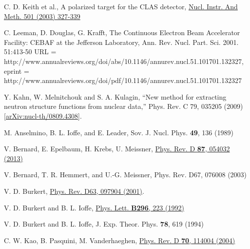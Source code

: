  C. D. Keith et al., A polarized target for the CLAS detector,                \href{https://userweb.jlab.org/\~ckeith/EG1/nim.pdf}{Nucl. Instr. And Meth. 501 (2003) 327-339}


 C. Leeman, D. Douglas, G. Krafft, The Continuous Electron Beam Accelerator Facility: CEBAF at the Jefferson Laboratory, Ann. Rev. Nucl. Part. Sci. 2001. 51:413-50     URL = {http://www.annualreviews.org/doi/abs/10.1146/annurev.nucl.51.101701.132327},   eprint = {http://www.annualreviews.org/doi/pdf/10.1146/annurev.nucl.51.101701.132327}

 Y. Kahn, W. Melnitchouk and S. A. Kulagin, “New method for extracting neutron structure functions from nuclear data,” Phys. Rev. C 79, 035205 (2009) \href{http://arxiv.org/abs/0809.4308}{[arXiv:nucl-th/0809.4308]}.

 M. Anselmino, B. L. Ioffe, and E. Leader, Sov. J. Nucl. Phys. {\bf 49}, 136 (1989) %

 V. Bernard, E. Epelbaum, H. Krebs, U. Meissner, \href{http://arxiv.org/abs/1209.2523}{Phys. Rev. D \textbf{87}, 054032 (2013) }

 V. Bernard, T. R. Hemmert, and U.-G. Meissner, Phys. Rev. D67, 076008 (2003)

 V. D. Burkert, \href{http://arxiv.org/abs/nucl-th/0004001}{Phys. Rev. D63, 097904 (2001)}.

 V. D. Burkert and B. L. Ioffe, \href{http://www.jlab.org/div\_dept/admin/publications/papers/92/PR92-018.pdf}{Phys. Lett. \textbf{B296}, 223 (1992)}  %

 V. D. Burkert and B. L. Ioffe, J. Exp. Theor. Phys. \textbf{78}, 619 (1994)

 C. W. Kao, B. Pasquini, M. Vanderhaeghen, \href{http://arxiv.org/abs/hep-ph/0408095}{Phys. Rev. D \textbf{70}, 114004 (2004)}

